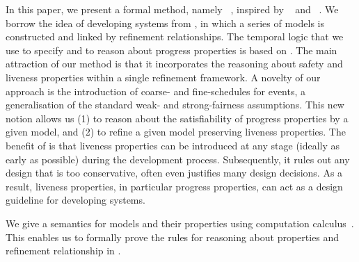 In this paper, we present a formal method, namely
\unitb~\cite{thesis/hudon2011}, inspired by
\unity~\cite{DBLP:books/daglib/0067338} and
\eventB~\cite{DBLP:books/daglib/0024570}.  We borrow the idea of
developing systems from \eventB, in which a series of models is
constructed and linked by refinement relationships.  The temporal
logic that we use to specify and to reason about progress properties
is based on \unity.  The main attraction of our method is that it
incorporates the reasoning about safety and liveness properties within
a single refinement framework.  A novelty of our approach is the
introduction of coarse- and fine-schedules for events, a
generalisation of the standard weak- and strong-fairness assumptions.
This new notion allows us (1) to reason about the satisfiability of
progress properties by a given model, and (2) to refine a given model
preserving liveness properties.  The benefit of \unitb is that
liveness properties can be introduced at any stage (ideally as early
as possible) during the development process.  Subsequently, it rules
out any design that is too conservative, often even justifies many
design decisions.  As a result, liveness properties, in particular
progress properties, can act as a design guideline for developing
systems.

We give a semantics for \unitb models and their properties using
computation calculus~\cite{Dijkstra:1998p1128}.  This enables us to
formally prove the rules for reasoning about properties and refinement
relationship in \unitb.



